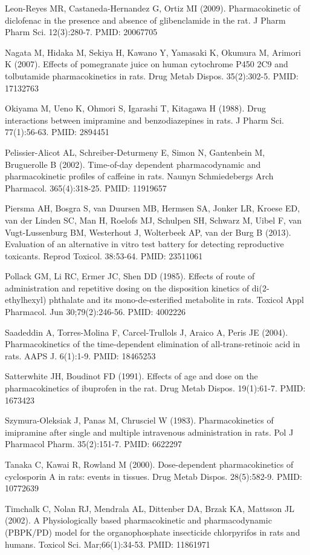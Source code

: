\documentclass[a4paper]{book}
\begin{document}
\begin{References}
Leon-Reyes MR, Castaneda-Hernandez G, Ortiz MI (2009). Pharmacokinetic of
diclofenac in the presence and absence of glibenclamide in the rat. J Pharm
Pharm Sci. 12(3):280-7. PMID: 20067705

Nagata M, Hidaka M, Sekiya H, Kawano Y, Yamasaki K, Okumura M, Arimori K
(2007). Effects of pomegranate juice on human cytochrome P450 2C9 and
tolbutamide pharmacokinetics in rats. Drug Metab Dispos. 35(2):302-5. PMID:
17132763

Okiyama M, Ueno K, Ohmori S, Igarashi T, Kitagawa H (1988). Drug
interactions between imipramine and benzodiazepines in rats. J Pharm Sci.
77(1):56-63. PMID: 2894451

Pelissier-Alicot AL, Schreiber-Deturmeny E, Simon N, Gantenbein M,
Bruguerolle B (2002). Time-of-day dependent pharmacodynamic and
pharmacokinetic profiles of caffeine in rats. Naunyn Schmiedebergs Arch
Pharmacol. 365(4):318-25. PMID: 11919657

Piersma AH, Bosgra S, van Duursen MB, Hermsen SA, Jonker LR, Kroese ED, van
der Linden SC, Man H, Roelofs MJ, Schulpen SH, Schwarz M, Uibel F, van
Vugt-Lussenburg BM, Westerhout J, Wolterbeek AP, van der Burg B (2013).
Evaluation of an alternative in vitro test battery for detecting
reproductive toxicants. Reprod Toxicol. 38:53-64. PMID: 23511061

Pollack GM, Li RC, Ermer JC, Shen DD (1985). Effects of route of
administration and repetitive dosing on the disposition kinetics of
di(2-ethylhexyl) phthalate and its mono-de-esterified metabolite in rats.
Toxicol Appl Pharmacol. Jun 30;79(2):246-56. PMID: 4002226

Saadeddin A, Torres-Molina F, Carcel-Trullols J, Araico A, Peris JE (2004).
Pharmacokinetics of the time-dependent elimination of all-trans-retinoic
acid in rats. AAPS J. 6(1):1-9. PMID: 18465253

Satterwhite JH, Boudinot FD (1991). Effects of age and dose on the
pharmacokinetics of ibuprofen in the rat. Drug Metab Dispos. 19(1):61-7.
PMID: 1673423

Szymura-Oleksiak J, Panas M, Chrusciel W (1983). Pharmacokinetics of
imipramine after single and multiple intravenous administration in rats. Pol
J Pharmacol Pharm. 35(2):151-7. PMID: 6622297

Tanaka C, Kawai R, Rowland M (2000). Dose-dependent pharmacokinetics of
cyclosporin A in rats: events in tissues. Drug Metab Dispos. 28(5):582-9.
PMID: 10772639

Timchalk C, Nolan RJ, Mendrala AL, Dittenber DA, Brzak KA, Mattsson JL
(2002). A Physiologically based pharmacokinetic and pharmacodynamic
(PBPK/PD) model for the organophosphate insecticide chlorpyrifos in rats and
humans. Toxicol Sci. Mar;66(1):34-53. PMID: 11861971


\end{References}
\end{document}
